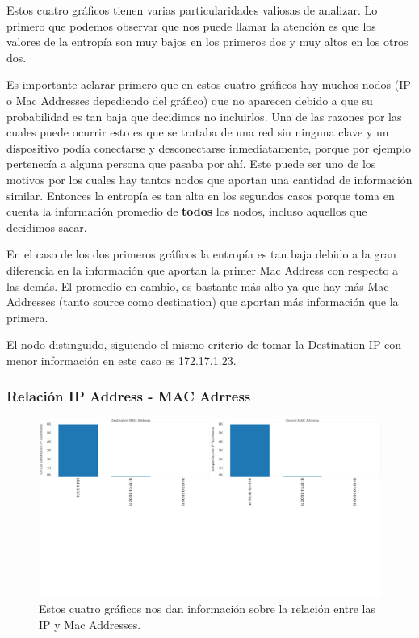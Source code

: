 \documentclass{article}
\theoremstyle{definition}
\theoremstyle{remark}
\begin{document}
Estos cuatro gráficos tienen varias particularidades valiosas de analizar. Lo primero que podemos observar que nos puede llamar la atención es que los valores de la entropía son muy bajos en los primeros dos y muy altos en los otros dos. 

Es importante aclarar primero que en estos cuatro gráficos hay muchos nodos (IP o Mac Addresses depediendo del gráfico) que no aparecen debido a que su probabilidad es tan baja que decidimos no incluirlos. Una de las razones por las cuales puede ocurrir esto es que se trataba de una red sin ninguna clave y un dispositivo podía conectarse y desconectarse inmediatamente, porque por ejemplo pertenecía a alguna persona que pasaba por ahí. Este puede ser uno de los motivos por los cuales hay tantos nodos que aportan una cantidad de información similar. Entonces la entropía es tan alta en los segundos casos porque toma en cuenta la información promedio de \textbf{todos} los nodos, incluso aquellos que decidimos sacar. 


En el caso de los dos primeros gráficos la entropía es tan baja debido a la gran diferencia en la información que aportan la primer Mac Address con respecto a las demás. El promedio en cambio, es bastante más alto ya que hay más Mac Addresses (tanto source como destination) que aportan más información que la primera.


El nodo distinguido, siguiendo el mismo criterio de tomar la Destination IP con menor información en este caso es 172.17.1.23.

\subsubsection{Relación IP Address - MAC Adrress}
\begin{figure}[H]
    \centering
    \includegraphics[width=1\textwidth]{captures/McDonalds/20min/IP vs MAC Correspondence.png}
    \caption{Estos cuatro gráficos nos dan información sobre la relación entre las IP y Mac Addresses.}
    \label{fig:mesh1}
\end{figure}
\end{document}
